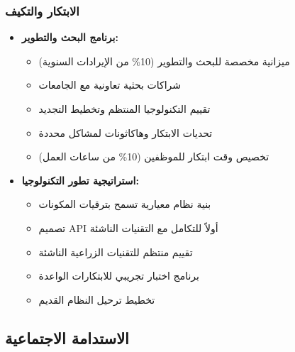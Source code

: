 \subsubsection{الابتكار والتكيف}
\begin{itemize}
    \item \textbf{برنامج البحث والتطوير:}
    \begin{itemize}
        \item ميزانية مخصصة للبحث والتطوير (10\% من الإيرادات السنوية)
        \item شراكات بحثية تعاونية مع الجامعات
        \item تقييم التكنولوجيا المنتظم وتخطيط التجديد
        \item تحديات الابتكار وهاكاثونات لمشاكل محددة
        \item تخصيص وقت ابتكار للموظفين (10\% من ساعات العمل)
    \end{itemize}
    
    \item \textbf{استراتيجية تطور التكنولوجيا:}
    \begin{itemize}
        \item بنية نظام معيارية تسمح بترقيات المكونات
        \item تصميم API أولاً للتكامل مع التقنيات الناشئة
        \item تقييم منتظم للتقنيات الزراعية الناشئة
        \item برنامج اختبار تجريبي للابتكارات الواعدة
        \item تخطيط ترحيل النظام القديم
    \end{itemize}
\end{itemize}

\subsection{الاستدامة الاجتماعية}

